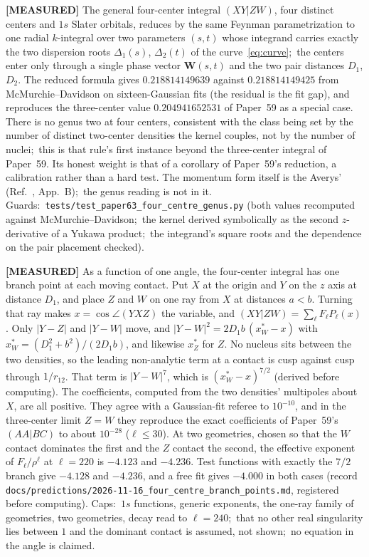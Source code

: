 \documentclass[aps,pra,twocolumn,superscriptaddress,longbibliography]{revtex4-2}
\begin{document}
\textbf{[MEASURED]} The general four-center integral $(XY|ZW)$, four
distinct centers and $1s$ Slater orbitals, reduces by the same Feynman
parametrization to one radial $k$-integral over two parameters $(s,t)$
whose integrand carries exactly the two dispersion roots
$\Delta_1(s)$, $\Delta_2(t)$ of the curve~\eqref{eq:curve};\ the centers enter
only through a single phase vector $\bm W(s,t)$ and the two pair
distances $D_1$, $D_2$.  The reduced formula gives $0.218814149639$
against $0.218814149425$ from McMurchie--Davidson on sixteen-Gaussian
fits (the residual is the fit gap), and reproduces the three-center
value $0.204941652531$ of Paper~59 as a special case.
There is no genus two at four centers, consistent with the class being
set by the number of distinct two-center densities the kernel couples,
not by the number of nuclei;\ this is that rule's first instance beyond
the three-center integral of Paper~59.  Its honest weight is that of a
corollary of Paper~59's reduction, a calibration rather than a hard
test.  The momentum form itself is the Averys'
(Ref.~\cite{avery_avery_4center}, App.~B);\ the genus reading is not in
it.  Guards:\ \texttt{tests/test\_paper63\_four\_centre\_genus.py} (both
values recomputed against McMurchie--Davidson;\ the kernel derived
symbolically as the second $z$-derivative of a Yukawa product;\ the
integrand's square roots and the dependence on the pair placement
checked).

\textbf{[MEASURED]} As a function of one angle, the four-center
integral has one branch point at each moving contact.  Put $X$ at the
origin and $Y$ on the $z$ axis at distance $D_1$, and place $Z$ and $W$ on
one ray from $X$ at distances $a<b$.  Turning that ray makes
$x=\cos\angle(YXZ)$ the variable, and
$(XY|ZW)=\sum_\ell F_\ell P_\ell(x)$.  Only $|Y-Z|$ and $|Y-W|$ move, and
$|Y-W|^2=2D_1b\,(x_W^{*}-x)$ with
$x_W^{*}=(D_1^2+b^2)/(2D_1b)$, and likewise $x_Z^{*}$ for $Z$.  No nucleus
sits between the two densities, so the leading non-analytic term at a
contact is cusp against cusp through $1/r_{12}$.  That term is
$|Y-W|^7$, which is $(x_W^{*}-x)^{7/2}$ (derived before computing).  The
coefficients, computed from the two densities' multipoles about $X$, are
all positive.  They agree with a Gaussian-fit referee to $10^{-10}$, and
in the three-center limit $Z=W$ they reproduce the exact coefficients
of Paper~59's $(AA|BC)$ to about $10^{-28}$ ($\ell\le30$).  At two geometries, chosen so that
the $W$ contact dominates the first and the $Z$ contact the second, the
effective exponent of $F_\ell/\rho^\ell$ at $\ell=220$ is $-4.123$ and
$-4.236$.  Test functions with exactly the $7/2$ branch give $-4.128$
and $-4.236$, and a free fit gives $-4.000$ in both cases (record
\texttt{docs/predictions/2026-11-16\_four\_centre\_branch\_points.md},
registered before computing).  Caps:\ $1s$ functions, generic
exponents, the one-ray family of geometries, two geometries, decay read
to $\ell=240$;\ that no other real singularity lies between $1$ and the
dominant contact is assumed, not shown;\ no equation in the angle is claimed.
\end{document}
